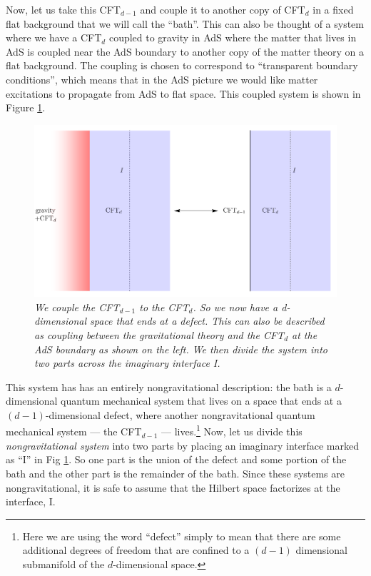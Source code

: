 \documentclass[12pt]{article}
\begin{document}
Now, let us take this CFT$_{d-1}$ and couple it to another copy of CFT$_d$ in a fixed flat background that we will call the ``bath''. This can also be 
thought of a system where we have a CFT$_d$ coupled to gravity in AdS where the matter that lives in AdS is coupled near the AdS boundary to another copy of the matter theory on a  
flat background. The coupling is chosen to correspond to ``transparent boundary conditions'', which means that in the AdS picture we would like  matter excitations to propagate from AdS to flat space. This coupled system is shown in Figure \ref{figholographiccoupled}.  
\begin{figure}[!ht]
\begin{center}
\includegraphics[height=0.4\textheight]{sysbathcoupling.pdf}
\caption{\em We couple the CFT$_{d-1}$ to the CFT$_d$. So we now have a d-dimensional space that ends at a defect. This can also be described as coupling between the gravitational theory and the CFT$_d$ at the AdS boundary as shown on the left. We then divide the system into two parts across the imaginary interface I. \label{figholographiccoupled}} 
\end{center}
\end{figure}

This system has  has an entirely nongravitational description: the bath is a  $d$-dimensional quantum mechanical system that lives on a space that ends at a $(d-1)$-dimensional defect, where another nongravitational quantum mechanical system --- the CFT$_{d-1}$ --- lives.\footnote{Here we are using the word ``defect'' simply to mean that there are some additional degrees of freedom that are confined to a $(d-1)$ dimensional submanifold of the $d$-dimensional space.}
Now, let us divide this {\em nongravitational system} into two parts by placing an imaginary interface marked as ``I'' in  Fig \ref{figholographiccoupled}. So one part is the  union of the defect and some portion of the bath and the other part is the remainder of the bath.  Since these systems are nongravitational, it is safe to assume that the Hilbert space factorizes at the interface, I. 
\end{document}
